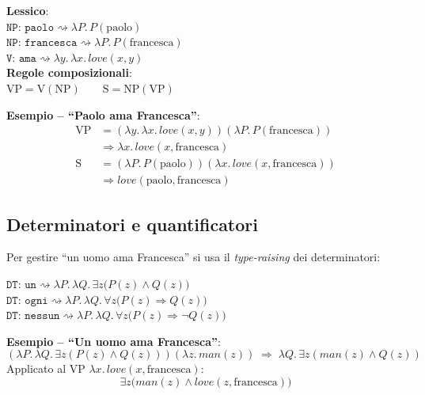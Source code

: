 \documentclass[12pt,a4paper]{article}
\begin{document}
\begin{formulabox}
\textbf{Lessico}:\\[2pt]
$\texttt{NP: paolo} \rightsquigarrow \lambda P.\,P(\text{paolo})$\\
$\texttt{NP: francesca} \rightsquigarrow \lambda P.\,P(\text{francesca})$\\
$\texttt{V: ama} \rightsquigarrow \lambda y.\,\lambda x.\,\mathit{love}(x,y)$\\[4pt]
\textbf{Regole composizionali}:\\[2pt]
$\text{VP} = \text{V}(\text{NP}) \qquad \text{S} = \text{NP}(\text{VP})$
\end{formulabox}

\textbf{Esempio -- ``Paolo ama Francesca''}:
\begin{align*}
\text{VP} &= (\lambda y.\,\lambda x.\,\mathit{love}(x,y))(\lambda P.\,P(\text{francesca}))\\
          &\Rightarrow \lambda x.\,\mathit{love}(x,\text{francesca})\\
\text{S}  &= (\lambda P.\,P(\text{paolo}))(\lambda x.\,\mathit{love}(x,\text{francesca}))\\
          &\Rightarrow \mathit{love}(\text{paolo},\text{francesca})
\end{align*}

\subsection{Determinatori e quantificatori}

Per gestire ``un uomo ama Francesca'' si usa il \emph{type-raising} dei determinatori:

\begin{formulabox}
$\texttt{DT: un} \rightsquigarrow \lambda P.\,\lambda Q.\,\exists z\bigl(P(z) \wedge Q(z)\bigr)$\\
$\texttt{DT: ogni} \rightsquigarrow \lambda P.\,\lambda Q.\,\forall z\bigl(P(z) \Rightarrow Q(z)\bigr)$\\
$\texttt{DT: nessun} \rightsquigarrow \lambda P.\,\lambda Q.\,\forall z\bigl(P(z) \Rightarrow \neg Q(z)\bigr)$
\end{formulabox}

\textbf{Esempio -- ``Un uomo ama Francesca''}:
\[
(\lambda P.\,\lambda Q.\,\exists z(P(z) \wedge Q(z)))(\lambda z.\,\mathit{man}(z))
\;\Rightarrow\; \lambda Q.\,\exists z(\mathit{man}(z) \wedge Q(z))
\]
Applicato al VP $\lambda x.\,\mathit{love}(x,\text{francesca})$:
\[
\exists z\bigl(\mathit{man}(z) \wedge \mathit{love}(z,\text{francesca})\bigr)
\]
\end{document}
